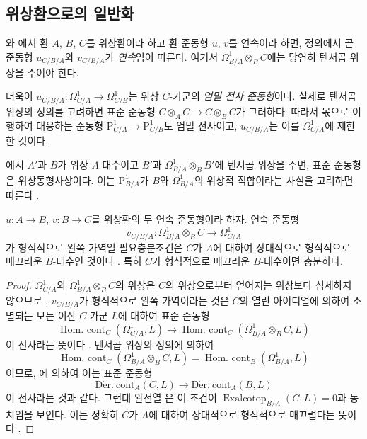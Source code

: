 \subsection{위상환으로의 일반화}
\label{subsection:0.20.7-ko}

\begin{env}[20.7.1]
\label{0.20.7.1-ko}
와 에서 환 $A$, $B$, $C$를
위상환이라 하고 환 준동형 $u$, $v$를 연속이라 하면, 정의에서 곧
준동형 $u_{C/B/A}$와 $v_{C/B/A}$가 \emph{연속}임이 따른다. 여기서
$\Omega^1_{B/A}\otimes_B C$에는 당연히 텐서곱 위상을 주어야 한다.

더욱이
$u_{C/B/A}:\Omega^1_{C/A}\to\Omega^1_{C/B}$는 위상 $C$-가군의
\emph{엄밀 전사 준동형}이다. 실제로 텐서곱 위상의 정의를 고려하면
표준 준동형 $C\otimes_A C\to C\otimes_B C$가 그러하다. 따라서
몫으로 이행하여 대응하는 준동형
$\mathrm{P}^1_{C/A}\to\mathrm{P}^1_{C/B}$도 엄밀 전사이고,
$u_{C/B/A}$는 이를 $\Omega^1_{C/A}$에 제한한 것이다.

에서 $A'$과 $B$가 위상 $A$-대수이고 $B'$과
$\Omega^1_{B/A}\otimes_B B'$에 텐서곱 위상을 주면, 표준 준동형
은 위상동형사상이다. 이는
$\mathrm{P}^1_{B/A}$가 $B$와 $\Omega^1_{B/A}$의 위상적 직합이라는
사실을 고려하면 따른다 .
\end{env}

\begin{proposition}[20.7.2]
\label{0.20.7.2-ko}
$u:A\to B$, $v:B\to C$를 위상환의 두 연속 준동형이라 하자. 연속
준동형
\[
  v_{C/B/A}:\Omega^1_{B/A}\otimes_B C\longrightarrow\Omega^1_{C/A}
\]
가 형식적으로 왼쪽 가역일  필요충분조건은 $C$가
$A$에 대하여 상대적으로 형식적으로 매끄러운 $B$-대수인 것이다
. 특히 $C$가 형식적으로 매끄러운 $B$-대수이면
충분하다.
\end{proposition}

\begin{proof}
$\Omega^1_{C/A}$와 $\Omega^1_{B/A}\otimes_B C$의 위상은 $C$의
위상으로부터 얻어지는 위상보다 섬세하지 않으므로
, $v_{C/B/A}$가 형식적으로 왼쪽 가역이라는 것은
$C$의 열린 아이디얼에 의하여 소멸되는 모든 이산 $C$-가군 $L$에
대하여 표준 준동형
\[
  \operatorname{Hom.\ cont}_C(\Omega^1_{C/A},L)\longrightarrow
  \operatorname{Hom.\ cont}_C(\Omega^1_{B/A}\otimes_B C,L)
\]
이 전사라는 뜻이다 . 텐서곱 위상의 정의에 의하여
\[
  \operatorname{Hom.\ cont}_C(\Omega^1_{B/A}\otimes_B C,L)
  =\operatorname{Hom.\ cont}_B(\Omega^1_{B/A},L)
\]
이므로, 에 의하여 이는 표준 준동형
\[
  \operatorname{D\acute{e}r.\ cont}_A(C,L)\longrightarrow
  \operatorname{D\acute{e}r.\ cont}_A(B,L)
\]
이 전사라는 것과 같다. 그런데 완전열 은 이 조건이
$\operatorname{Exalcotop}_{B/A}(C,L)=0$과 동치임을 보인다. 이는 정확히
$C$가 $A$에 대하여 상대적으로 형식적으로 매끄럽다는 뜻이다
.
\end{proof}


